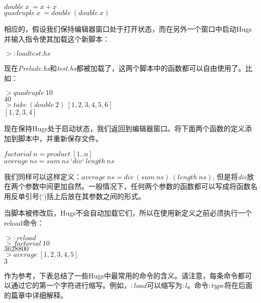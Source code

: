 \noindent\hspace*{1cm} $double~x~= x + x$\\
\hspace*{1cm} $quadruple~x~= double~(double~x)$

相应的，假设我们保持编辑器窗口处于打开状态，而在另外一个窗口中启动Hugs并输入指令使其加载这个新脚本：

\noindent\hspace*{1cm} $> :load test.hs$

现在\textit{Prelude.hs}和\textit{test.hs}都被加载了，这两个脚本中的函数都可以自由使用了。比如：

\noindent\hspace*{1cm} $> quadruple~10$\\
\hspace*{1cm} $40$\\
\hspace*{1cm} $> take~(double~2)~[1, 2, 3, 4, 5, 6]$\\
\hspace*{1cm} $[1, 2, 3, 4]$

现在保持Hugs处于启动状态，我们返回到编辑器窗口。将下面两个函数的定义添加到脚本中，并重新保存文件。

\noindent\hspace*{1cm} $factorial~n = product~[1 . . n]$\\
\hspace*{1cm} $average~ns = sum~ns~‘div ‘~length~ns$

我们同样可以这样定义：$average~ns = div~(sum~ns)~(length~ns)$,
但是将\textit{div}放在两个参数中间更加自然。一般情况下，任何两个参数的函数都可以写成将函数名用反单引号(`)括上后放在其参数之间的形式。

当脚本被修改后，Hugs不会自动加载它们，所以在使用新定义之前必须执行一个reload命令：

\noindent\hspace*{1cm} $> :reload$\\
\hspace*{1cm} $> factorial~10$\\
\hspace*{1cm} $3628800$\\
\hspace*{1cm} $> average~[1, 2, 3, 4, 5]$\\
\hspace*{1cm} $3$

作为参考，下表总结了一些Hugs中最常用的命令的含义。请注意，每条命令都可以通过它的第一个字符进行缩写。例如，$:load$可以缩写为$:l$。命令$:type$将在后面的篇章中详细解释。

